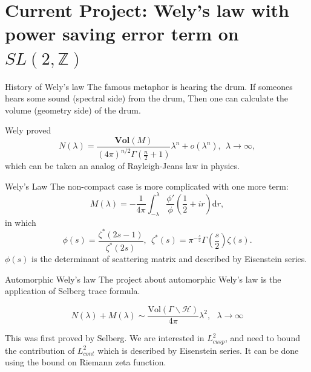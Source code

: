 \documentclass[aspectratio=169]{beamer}
\theoremstyle{plain}
\theoremstyle{definition}
\theoremstyle{remark}
\newcommand{\dif}{\text{d}}
\begin{document}
\section{Current Project: Wely's law with power saving error term on $SL(2,\mathbb{Z})$}
\begin{frame}{History of Wely's law}
    The famous metaphor is hearing the drum. If someones hears some sound (spectral side) from the drum, Then one can calculate the volume (geometry side) of the drum.
    
    \vspace{0.5 cm}
    
    Wely proved
    \begin{equation*}
        N(\lambda)=\frac{\textbf{Vol}(M)}{(4\pi)^{n/2}\Gamma(\frac{n}{2}+1)}\lambda^{n}+o(\lambda^{n}), \ \ \lambda\rightarrow\infty,
    \end{equation*}
    which can be taken an analog of  Rayleigh-Jeans law in physics.
    
\end{frame}
\begin{frame}{Wely's Law}
    The non-compact case is more complicated with one more term:
    \begin{equation*}
      M(\lambda)=-\frac{1}{4\pi}\int^{\lambda}_{-\lambda}\frac{\phi'}{\phi}(\frac{1}{2}+ir)\dif r,
    \end{equation*}
    in which 
    \begin{equation*}
      \phi(s)=\frac{\zeta^{*}(2s-1)}{\zeta^{*}(2s)},\ \ \zeta^{*}(s)=\pi^{-\frac{s}{2}}\Gamma(\frac{s}{2})\zeta(s).
    \end{equation*}
    $\phi(s)$ is the determinant of scattering matrix and described by Eisenstein series.
\end{frame}
\begin{frame}{Automorphic Wely's law}
    The project about automorphic Wely's law is the application of Selberg trace formula. 
    
    \begin{equation*}
    N(\lambda)+M(\lambda) \sim \frac{\text{Vol}(\Gamma\backslash \mathcal{H})}{4\pi}\lambda^{2},\ \ \ \lambda\rightarrow\infty    
    \end{equation*}
    
    
    This was first proved by Selberg. We are interested in $L^{2}_{cusp}$, and need to bound the contribution of $L^{2}_{cont}$ which is described by Eisenstein series. It can be done using the bound on Riemann zeta function.
\end{frame}
\end{document}
